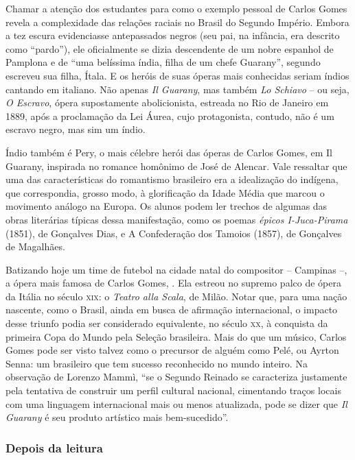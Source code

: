 \documentclass[11pt]{extarticle}
\begin{document}
Chamar a atenção dos estudantes para como o exemplo pessoal de Carlos Gomes
revela a complexidade das relações raciais no Brasil do Segundo Império. Embora
a tez escura evidenciasse antepassados negros (seu pai, na infância, era
descrito como “pardo”), ele oficialmente se dizia descendente de um nobre
espanhol de Pamplona e de ``uma belíssima índia, filha de um chefe Guarany'',
segundo escreveu sua filha, Ítala. E os heróis de suas óperas mais conhecidas
seriam índios cantando em italiano. Não apenas \emph{Il Guarany}, mas também \emph{Lo
Schiavo} – ou seja, \emph{O Escravo}, ópera supostamente abolicionista, estreada no Rio
de Janeiro em 1889, após a proclamação da Lei Áurea, cujo protagonista,
contudo, não é um escravo negro, mas sim um índio.

Índio também é Pery, o mais célebre herói das óperas de Carlos Gomes, em Il
Guarany, inspirada no romance homônimo de José de Alencar. Vale ressaltar que
uma das características do romantismo brasileiro era a idealização do indígena,
que correspondia, grosso modo, à glorificação da Idade Média que marcou o
movimento análogo na Europa. Os alunos podem ler trechos de algumas das obras
literárias  típicas dessa manifestação, como os poemas \emph{épicos I-Juca-Pirama}
(1851), de Gonçalves Dias, e A Confederação dos Tamoios (1857), de Gonçalves de
Magalhães.

Batizando hoje um time de futebol na cidade natal do compositor – Campinas –, a
ópera mais famosa de Carlos Gomes, . Ela estreou no supremo palco de ópera da Itália no
século \textsc{xix}: o \textit{Teatro alla Scala}, de Milão. Notar que, para uma nação nascente,
como o Brasil, ainda em busca de afirmação internacional, o impacto desse
triunfo podia ser considerado equivalente, no século \textsc{xx}, à conquista da
primeira Copa do Mundo pela Seleção brasileira. Mais do que um músico, Carlos
Gomes pode ser visto talvez como o precursor de alguém como Pelé, ou Ayrton
Senna: um brasileiro que tem sucesso reconhecido no mundo inteiro. Na
observação de Lorenzo Mammì, ``se o Segundo Reinado se caracteriza justamente
pela tentativa de construir um perfil cultural nacional, cimentando traços
locais com uma linguagem internacional mais ou menos atualizada, pode se dizer
que \emph{Il Guarany} é seu produto artístico mais bem-sucedido''.

\subsubsection{Depois da leitura}
\end{document}
